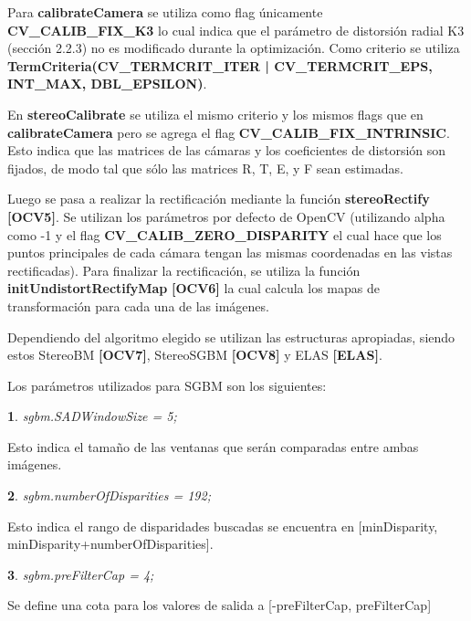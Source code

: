 \documentclass[11pt,a4paper,titlepage]{article}
\newtheorem{mytheorem}{}
\newenvironment{theorem}%
  {\begin{lrbox}{\thmbox}%
   \begin{minipage}{\dimexpr\linewidth-2\fboxsep}
   \begin{mytheorem}}%
  {\end{mytheorem}%
   \end{minipage}%
   \end{lrbox}%
   \begin{trivlist}
     \item[]\colorbox{lightgray}{\usebox\thmbox}
   \end{trivlist}}
\begin{document}
\begin{sloppypar}
Para \textbf{calibrateCamera} se utiliza como flag únicamente \textbf{CV\_CALIB\_FIX\_K3} lo cual indica que el parámetro de distorsión radial K3 (sección 2.2.3) no es modificado durante la optimización. Como criterio se utiliza \textbf{TermCriteria(CV\_TERMCRIT\_ITER | CV\_TERMCRIT\_EPS, INT\_MAX, DBL\_EPSILON)}.
\end{sloppypar}

En \textbf{stereoCalibrate} se utiliza el mismo criterio y los mismos flags que en \textbf{calibrateCamera} pero se agrega el flag \textbf{CV\_CALIB\_FIX\_INTRINSIC}. Esto indica que las matrices de las cámaras y los coeficientes de distorsión son fijados, de modo tal que sólo las matrices R, T, E, y F sean estimadas.

Luego se pasa a realizar la rectificación mediante la función \textbf{stereoRectify} \textbf{[OCV5]}. Se utilizan los parámetros por defecto de OpenCV (utilizando alpha como -1 y el flag \textbf{CV\_CALIB\_ZERO\_DISPARITY} el cual hace que los puntos principales de cada cámara tengan las mismas coordenadas en las vistas rectificadas).
Para finalizar la rectificación, se utiliza la función \textbf{initUndistortRectifyMap} \textbf{[OCV6]} la cual calcula los mapas de transformación para cada una de las imágenes.

Dependiendo del algoritmo elegido se utilizan las estructuras apropiadas, siendo estos StereoBM \textbf{[OCV7]}, StereoSGBM \textbf{[OCV8]} y ELAS \textbf{[ELAS]}.

Los parámetros utilizados para SGBM son los siguientes:

\begin{theorem}
sgbm.SADWindowSize = 5;
\end{theorem}

Esto indica el tamaño de las ventanas que serán comparadas entre ambas imágenes.

\begin{theorem}
sgbm.numberOfDisparities = 192;
\end{theorem}

Esto indica el rango de disparidades buscadas se encuentra en [minDisparity, minDisparity+numberOfDisparities].

\begin{theorem}
sgbm.preFilterCap = 4;
\end{theorem}

Se define una cota para los valores de salida a [-preFilterCap, preFilterCap]
\end{document}

